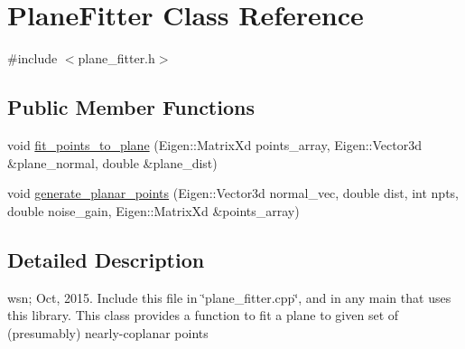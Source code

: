 \hypertarget{class_plane_fitter}{\section{Plane\-Fitter Class Reference}
\label{class_plane_fitter}
}


{\ttfamily \#include $<$plane\-\_\-fitter.\-h$>$}

\subsection*{Public Member Functions}
\begin{DoxyCompactItemize}
\item 
void \hyperlink{class_plane_fitter_ad514557574358e4ab362b0142f6cf7a2}{fit\-\_\-points\-\_\-to\-\_\-plane} (Eigen\-::\-Matrix\-Xd points\-\_\-array, Eigen\-::\-Vector3d \&plane\-\_\-normal, double \&plane\-\_\-dist)
\item 
void \hyperlink{class_plane_fitter_ab8a9e1573011da8e610c04f268dfc575}{generate\-\_\-planar\-\_\-points} (Eigen\-::\-Vector3d normal\-\_\-vec, double dist, int npts, double noise\-\_\-gain, Eigen\-::\-Matrix\-Xd \&points\-\_\-array)
\end{DoxyCompactItemize}


\subsection{Detailed Description}
wsn; Oct, 2015. Include this file in \char`\"{}plane\-\_\-fitter.\-cpp\char`\"{}, and in any main that uses this library. This class provides a function to fit a plane to given set of (presumably) nearly-\/coplanar points 

